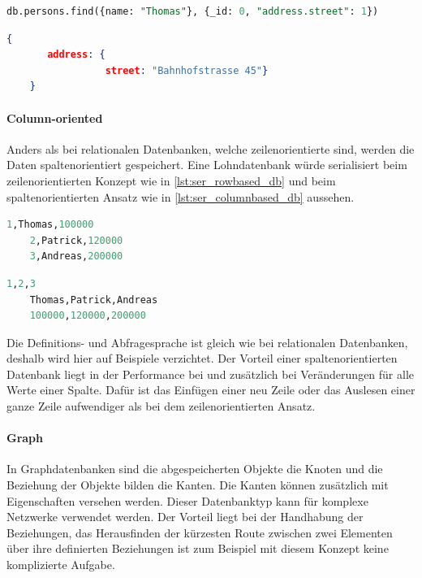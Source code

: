 \begin{lstlisting}[language=SQL, caption=Abfrage in MongoDB, label=lst:select_mongodb]  
    db.persons.find({name: "Thomas"}, {_id: 0, "address.street": 1})
\end{lstlisting}

\begin{lstlisting}[language=JSON, caption=Resultat der Abfrage in MongoDB, label=lst:select_result_mongodb]  
    {
       address: {
                 street: "Bahnhofstrasse 45"}
    }
\end{lstlisting}

\paragraph{Column-oriented}
Anders als bei relationalen Datenbanken, welche zeilenorientierte sind, werden die Daten spaltenorientiert gespeichert. Eine Lohndatenbank würde serialisiert beim zeilenorientierten Konzept
wie in \autoref{lst:ser_rowbased_db} und beim spaltenorientierten Ansatz wie in \autoref{lst:ser_columnbased_db} aussehen.

\begin{lstlisting}[language=SQL, caption=Serialisierung zeilenorientierte Datenbank, label=lst:ser_rowbased_db]  
    1,Thomas,100000
    2,Patrick,120000
    3,Andreas,200000
\end{lstlisting}

\begin{lstlisting}[language=SQL, caption=Serialisierung spaltenorientierte Datenbank, label=lst:ser_columnbased_db]  
    1,2,3
    Thomas,Patrick,Andreas
    100000,120000,200000
\end{lstlisting}

Die Definitions- und Abfragesprache ist gleich wie bei relationalen Datenbanken, deshalb wird hier auf Beispiele verzichtet. Der Vorteil einer spaltenorientierten Datenbank liegt in der Performance bei  und zusätzlich bei Veränderungen für alle Werte einer Spalte. Dafür ist das 
Einfügen einer neu Zeile oder das Auslesen einer ganze Zeile aufwendiger als bei dem zeilenorientierten Ansatz.

\paragraph{Graph}
In Graphdatenbanken sind die abgespeicherten Objekte die Knoten und die Beziehung der Objekte bilden die Kanten. Die Kanten können zusätzlich mit Eigenschaften versehen werden. Dieser 
Datenbanktyp kann für komplexe Netzwerke verwendet werden. Der Vorteil liegt bei der Handhabung der Beziehungen, das Herausfinden der kürzesten Route zwischen zwei Elementen über 
ihre definierten Beziehungen ist zum Beispiel mit diesem Konzept keine komplizierte Aufgabe.

